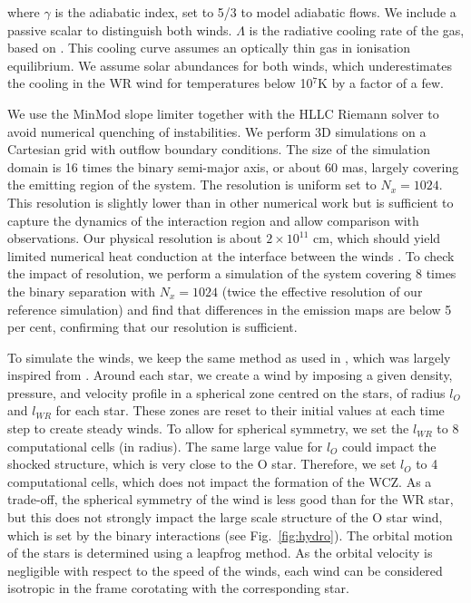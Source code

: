 \documentclass[usenatbib]{mnras}%
\begin{document}
where $\gamma$ is the adiabatic index, set to 5/3 to model adiabatic flows. We include a passive scalar to distinguish both winds. $\Lambda$ is the radiative cooling rate of the gas, based on \citet{1993ApJS...88..253S}. This cooling curve assumes an optically thin gas in ionisation equilibrium. We assume solar abundances for both winds, which underestimates the cooling in the WR wind for temperatures below 10$^7$K \citep{Stevens:1992on} by a factor of a few.

We use the MinMod slope limiter together with the HLLC Riemann solver to avoid numerical quenching of instabilities. We perform 3D simulations on a Cartesian grid with outflow boundary conditions.   The size of the simulation domain is 16 times the binary semi-major axis, or about 60 mas, largely covering the emitting region of the system. The resolution is uniform set to  $N_x=1024$. This resolution is slightly lower than in other numerical work \citep{2009MNRAS.396.1743P,2012A&A...546A..60L} but is sufficient to capture the dynamics of the interaction region and allow comparison with observations.  Our physical resolution is about $2\times 10^{11}$ cm, which should yield limited numerical heat conduction at the interface between the winds \citep{2010MNRAS.406.2373P}. To check the impact of resolution, we perform a simulation of the system covering 8 times the binary separation with $N_x=1024$ (twice the effective resolution of our reference simulation) and find that differences in the emission maps are below 5 per cent, confirming that our resolution is sufficient.

To simulate the winds, we keep the same method as used in \citet{2011MNRAS.418.2618L}, which was largely inspired from \citet{Lemaster:2007sl}. Around each star, we create a wind by imposing a given density, pressure, and velocity profile in a spherical zone centred on the stars, of radius $l_O$ and $l_{WR}$ for each star. These zones are reset to their initial values at each time step to create steady winds. To allow for spherical symmetry, we set the $l_{WR}$ to 8 computational cells (in radius). The same large value for $l_O$ could impact the shocked structure, which is very close to the O star. Therefore, we set $l_O$ to 4 computational cells, which does not impact the formation of the WCZ. As a trade-off, the spherical symmetry of the wind is less good than for the WR star, but this does not strongly impact the large scale structure of the O star wind, which is set by the binary interactions (see Fig.~\ref{fig:hydro}). The orbital motion of the stars is determined using a leapfrog method.  As the orbital velocity is negligible with respect to the speed of the winds, each wind can be considered isotropic in the frame corotating with the corresponding star.   
\end{document}
